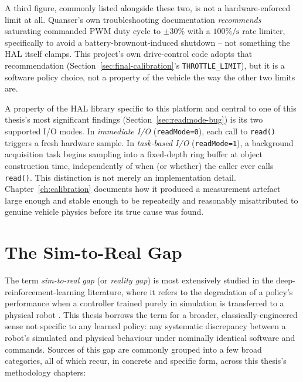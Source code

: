 A third figure, commonly listed alongside these two, is not a
hardware-enforced limit at all. Quanser's own troubleshooting
documentation \emph{recommends} saturating commanded PWM duty cycle
to $\pm 30\%$ with a $100\%/\mathrm{s}$ rate limiter, specifically to
avoid a battery-brownout-induced shutdown
\cite{quanser2023troubleshooting} -- not something the HAL itself
clamps. This project's own drive-control code adopts that
recommendation (Section~\ref{sec:final-calibration}'s
\texttt{THROTTLE\_LIMIT}), but it is a software policy choice, not a
property of the vehicle the way the other two limits are.

A property of the HAL library specific to this platform and central
to one of this thesis's most significant findings
(Section~\ref{sec:readmode-bug}) is its two supported I/O modes. In
\emph{immediate I/O} (\texttt{readMode=0}), each call to
\texttt{read()} triggers a fresh hardware sample. In \emph{task-based
I/O} (\texttt{readMode=1}), a background acquisition task begins
sampling into a fixed-depth ring buffer at object construction time,
independently of when (or whether) the caller ever calls
\texttt{read()}. This distinction is not merely an implementation
detail. Chapter~\ref{ch:calibration} documents how it produced a
measurement artefact large enough and stable enough to be
repeatedly and reasonably misattributed to genuine vehicle physics
before its true cause was found.

\section{The Sim-to-Real Gap}
\label{sec:sim-to-real-concept}

The term \emph{sim-to-real gap} (or \emph{reality gap}) is most
extensively studied in the deep-reinforcement-learning literature,
where it refers to the degradation of a policy's performance when a
controller trained purely in simulation is transferred to a physical
robot \cite{zhao2020sim2real}. This thesis borrows the term for a
broader, classically-engineered sense not specific to any learned
policy: any systematic discrepancy between a robot's simulated and
physical behaviour under nominally identical software and commands.
Sources of this gap are commonly grouped into a few broad categories,
all of which recur, in concrete and specific form, across this
thesis's methodology chapters:

